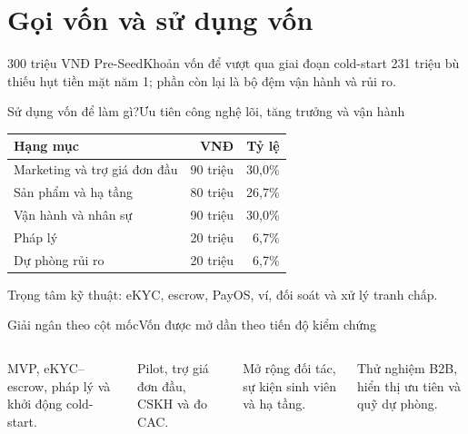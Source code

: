 \section{Gọi vốn và sử dụng vốn}

\begin{frame}{300 triệu VNĐ Pre-Seed}{Khoản vốn để vượt qua giai đoạn cold-start}
  \vspace{1.2em}
  \centering
  \vfill
  \centering\small\color{cookieMuted}
  231 triệu bù thiếu hụt tiền mặt năm 1; phần còn lại là bộ đệm vận hành và rủi ro.
\end{frame}

\begin{frame}{Sử dụng vốn để làm gì?}{Ưu tiên công nghệ lõi, tăng trưởng và vận hành}
  \vspace{.8em}
  \centering\small
  \begin{tabularx}{.88\textwidth}{@{}Xrr@{}}
    \toprule
    \textbf{Hạng mục} & \textbf{VNĐ} & \textbf{Tỷ lệ} \\
    \midrule
    Marketing và trợ giá đơn đầu & 90 triệu & 30,0\% \\
    Sản phẩm và hạ tầng & 80 triệu & 26,7\% \\
    Vận hành và nhân sự & 90 triệu & 30,0\% \\
    Pháp lý & 20 triệu & 6,7\% \\
    Dự phòng rủi ro & 20 triệu & 6,7\% \\
    \bottomrule
  \end{tabularx}
  \vfill
  \centering\small\color{cookieMuted}
  Trọng tâm kỹ thuật: eKYC, escrow, PayOS, ví, đối soát và xử lý tranh chấp.
\end{frame}

\begin{frame}{Giải ngân theo cột mốc}{Vốn được mở dần theo tiến độ kiểm chứng}
  \vspace{1em}
  \begin{columns}[T,onlytextwidth]
      \par\vspace{.4em}
      MVP, eKYC--escrow, pháp lý và khởi động cold-start.
      \par\vspace{.4em}
      Pilot, trợ giá đơn đầu, CSKH và đo CAC.
      \par\vspace{.4em}
      Mở rộng đối tác, sự kiện sinh viên và hạ tầng.
      \par\vspace{.4em}
      Thử nghiệm B2B, hiển thị ưu tiên và quỹ dự phòng.
  \end{columns}
\end{frame}

